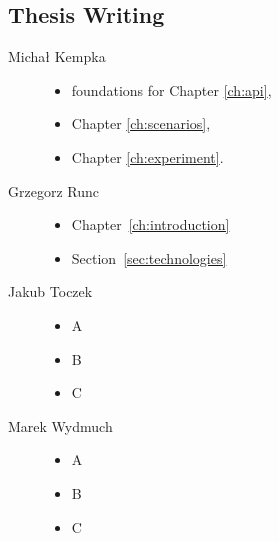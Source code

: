 	\subsection{Thesis Writing}
	\begin{description}
		\item[Michał Kempka] \hfill
			\begin{itemize}
				\item foundations for Chapter \ref{ch:api},
				\item Chapter \ref{ch:scenarios},
				\item Chapter \ref{ch:experiment}.
			\end{itemize}
		\item[Grzegorz Runc] \hfill
			\begin{itemize}
				\item Chapter~\ref{ch:introduction}
				\item Section~\ref{sec:technologies}
			\end{itemize}
		\item[Jakub Toczek] \hfill
			\begin{itemize}
				\item A
				\item B
				\item C
			\end{itemize}
		\item[Marek Wydmuch] \hfill
			\begin{itemize}
				\item A
				\item B
				\item C
			\end{itemize}
	\end{description}
